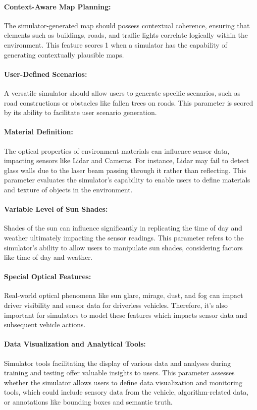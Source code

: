 \documentclass[12pt,twoside,a4paper,parskip]{scrbook} %
\begin{document}
\paragraph*{Context-Aware Map Planning:}
The simulator-generated map should possess contextual coherence, ensuring that elements such as buildings, roads, and traffic lights correlate logically within the environment. This feature scores 1 when a simulator has the capability of generating contextually plausible maps.
\paragraph*{User-Defined Scenarios:}
A versatile simulator should allow users to generate specific scenarios, such as road constructions or obstacles like fallen trees on roads. This parameter is scored by its ability to facilitate user scenario generation.
\paragraph*{Material Definition:}
The optical properties of environment materials can influence sensor data, impacting sensors like Lidar and Cameras. For instance, Lidar may fail to detect glass walls due to the laser beam passing through it rather than reflecting. This parameter evaluates the simulator's capability to enable users to define materials and texture of objects in the environment.
\paragraph*{Variable Level of Sun Shades:}
Shades of the sun can influence significantly in replicating the time of day and weather ultimately impacting the sensor readings. This parameter refers to the simulator's ability to allow users to manipulate sun shades, considering factors like time of day and weather.
\paragraph*{Special Optical Features:}
Real-world optical phenomena like sun glare, mirage, dust, and fog can impact driver visibility and sensor data for driverless vehicles. Therefore, it's also important for simulators to model these features which impacts sensor data and subsequent vehicle actions.
\paragraph*{Data Visualization and Analytical Tools:}
Simulator tools facilitating the display of various data and analyses during training and testing offer valuable insights to users. This parameter assesses whether the simulator allows users to define data visualization and monitoring tools, which could include sensory data from the vehicle, algorithm-related data, or annotations like bounding boxes and semantic truth.
\end{document}
